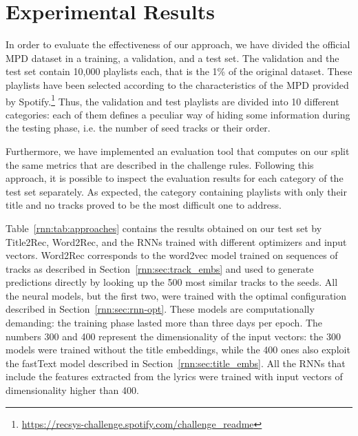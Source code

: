 \section{Experimental Results}
\label{rnn:sec:results}

In order to evaluate the effectiveness of our approach, we have divided the official MPD dataset in a training, a validation, and a test set. The validation and the test set contain 10,000 playlists each, that is the 1\% of the original dataset. These playlists have been selected according to the characteristics of the MPD provided by Spotify.\footnote{\url{https://recsys-challenge.spotify.com/challenge_readme}} Thus, the validation and test playlists are divided into 10 different categories: each of them defines a peculiar way of hiding some information during the testing phase, i.e. the number of seed tracks or their order.

Furthermore, we have implemented an evaluation tool that computes on our split the same metrics that are described in the challenge rules. Following this approach, it is possible to inspect the evaluation results for each category of the test set separately. As expected, the category containing playlists with only their title and no tracks proved to be the most difficult one to address.

Table~\ref{rnn:tab:approaches} contains the results obtained on our test set by Title2Rec, Word2Rec, and the RNNs trained with different optimizers and input vectors. Word2Rec corresponds to the word2vec model trained on sequences of tracks as described in Section~\ref{rnn:sec:track_embs} and used to generate predictions directly by looking up the 500 most similar tracks to the seeds. All the neural models, but the first two, were trained with the optimal configuration described in Section~\ref{rnn:sec:rnn-opt}. These models are computationally demanding: the training phase lasted more than three days per epoch. The numbers 300 and 400 represent the dimensionality of the input vectors: the 300 models were trained without the title embeddings, while the 400 ones also exploit the fastText model described in Section~\ref{rnn:sec:title_embs}. All the RNNs that include the features extracted from the lyrics were trained with input vectors of dimensionality higher than 400.

